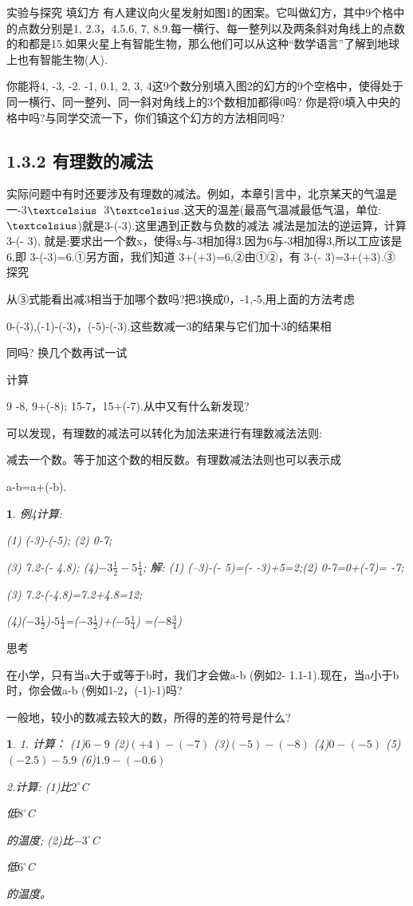 \documentclass[UTF8]{article}
\newtheorem{exercise}{ }
\newtheorem{example}{ }
\begin{document}
实验与探究
填幻方
有人建议向火星发射如图1的困案。它叫做幻方，其中9个格中的点数分别是1, 2.3，4.5.6, 7, 8.9.每一横行、每一整列以及两条斜对角线上的点数的和都是15.如果火星上有智能生物，那么他们可以从这种“数学语言”了解到地球上也有智能生物(人).

你能将4, -3, -2. -1, 0.1, 2, 3, 4这9个数分别填入图2的幻方的9个空格中，使得处于同一横行、同一整列、同一斜对角线上的3个数相加都得0吗?
你是将0填入中央的格中吗?与同学交流一下，你们镇这个幻方的方法相同吗?

\subsection*{1.3.2 有理数的减法}
实际问题中有时还要涉及有理数的减法。例如，本章引言中，北京某天的气温是一-3${\textcelsius }$~3${\textcelsius}$,这天的温差(最高气温减最低气温，单位:${\textcelsius }$)就是3-(-3).这里遇到正数与负数的减法
减法是加法的逆运算，计算3-(- 3), 就是:要求出一个数x，使得x与-3相加得3.因为6与-3相加得3,所以工应该是6,即
3-(-3)=6.①另方面，我们知道
3+(+3)=6,②由①②，有
3-(- 3)=3+(+3).③
探究

从③式能看出减3相当于加哪个数吗?把3换成0，-1,-5,用上面的方法考虑

0-(-3),(-1)-(-3)，(-5)-(-3).这些数减一3的结果与它们加十3的结果相

同吗?  换几个数再试一试

计算

9 -8, 9+(-8); 15-7，15+(-7).从中又有什么新发现?

可以发现，有理数的减法可以转化为加法来进行有理数减法法则:

减去一个数。等于加这个数的相反数。有理数减法法则也可以表示成

a-b=a+(-b).

\begin{example}
例4计算:

(1) (-3)-(-5);  (2) 0-7;

(3) 7.2-(- 4.8);  (4)$-3\frac{1}{2}-5\frac{1}{4}$;
解: 
(1) (--3)-(- 5)=(- -3)+5=2;(2) 0-7=0+(-7)= -7;

(3) 7.2-(-4.8)=7.2+4.8=12;

(4)($-3\frac{1}{2}$)-$5\frac{1}{4}$=($-3\frac{1}{2}$)+($-5\frac{1}{4}$) =($-8\frac{3}{4}$)
\end{example}

思考

在小学，只有当a大于或等于b时，我们才会做a-b (例如2- 1.1-1).现在，当a小于b时，你会做a-b (例如1-2，(-1)-1)吗?

一般地，较小的数减去较大的数，所得的差的符号是什么?
\begin{exercise}
1. 计算：
(1)$6-9$
(2)$(+4)-(-7)$
(3)$(-5)-(-8)$
(4)$0-(-5)$
(5)$(-2.5)-5.9$
(6)$1.9-(-0.6)$

2.计算:
(1)比$2^\circ$C \par 低$8^\circ$C \par 的温度;
(2)比$-3^\circ$C \par 低$6^\circ$C \par 的温度。

\end{exercise}
\end{document}
